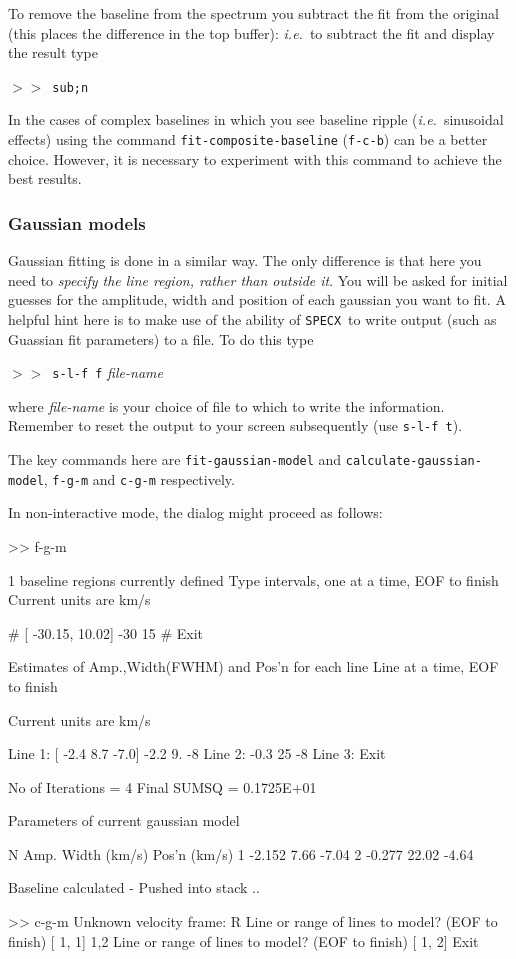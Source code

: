 \documentclass[11pt,twoside]{starlink}
\providecommand{\ie}{\textit{i.e.}}
\providecommand{\SPECX}{\texttt{SPECX}}
\providecommand{\SP}{{$>\!>$}}
\begin{document}
To remove the baseline from the spectrum you subtract the fit from the
original (this places the difference in the top buffer): \ie\ to
subtract the fit and display the result type

\SP\ \verb|sub;n|

In the cases of complex baselines in which you see baseline ripple
(\ie\ sinusoidal effects) using the command \texttt{fit-composite-baseline} ({\tt{f-c-b}}) can be a better choice. However,
it is necessary to experiment with this command to achieve the best
results.

\subsubsection{Gaussian models}
Gaussian fitting is done in a similar way.  The only difference is
that here you need to \textit{specify the line region, rather than outside
it}. You will be asked for initial guesses for the amplitude, width and
position of each gaussian you want to fit. A helpful hint here is to
make use of the ability of \SPECX\ to write output (such as Guassian
fit parameters) to a file. To do this type

\SP\ \verb|s-l-f f| \textit{file-name}

where \textit{file-name} is your choice of file to which to write the
information.  Remember to reset the output to your screen subsequently
(use \texttt{s-l-f t}).

The key commands here are \texttt{fit-gaussian-model} and \texttt{calculate-gaussian-model}, \texttt{f-g-m} and \texttt{c-g-m} respectively.

In non-interactive mode, the dialog might proceed as follows:
\begin{terminalv}
>> f-g-m

          1 baseline regions currently defined
Type intervals, one at a time, EOF to finish
Current units are km/s

# [  -30.15,   10.02] -30 15
#  Exit

Estimates of Amp.,Width(FWHM) and Pos'n for each line
Line at a time, EOF to finish

Current units are km/s

Line  1: [  -2.4  8.7    -7.0] -2.2 9. -8
Line  2: -0.3 25 -8
Line  3:  Exit

         No of Iterations =     4          Final SUMSQ = 0.1725E+01

                  Parameters of current gaussian model

                 N       Amp.        Width (km/s)    Pos'n (km/s)
                 1     -2.152           7.66            -7.04
                 2     -0.277          22.02            -4.64

Baseline calculated - Pushed into stack
..

>> c-g-m
Unknown velocity frame: R
Line or range of lines to model? (EOF to finish) [ 1, 1] 1,2
Line or range of lines to model? (EOF to finish) [ 1, 2]  Exit
\end{terminalv}
\end{document}
